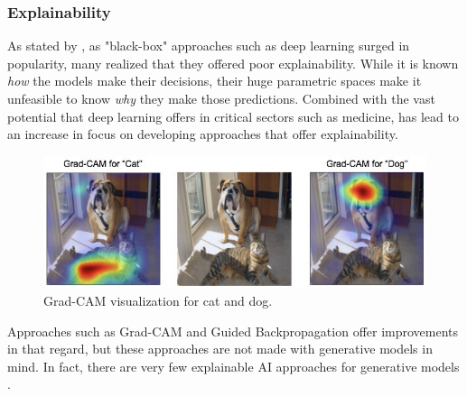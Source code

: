 \subsubsection{Explainability}
As stated by \textcite{XAI}, as "black-box" approaches such as deep learning surged in popularity, many realized that they offered poor explainability. While it is known \textit{how} the models make their decisions, their huge parametric spaces make it unfeasible to know \textit{why} they make those predictions. Combined with the vast potential that deep learning offers in critical sectors such as medicine, has lead to an increase in focus on developing approaches that offer explainability.
\begin{figure}[H]
    \centering
    \includegraphics[width=\linewidth]{resources/related_works/gradcam.jpg}
    \caption{Grad-CAM visualization for cat and dog.}
\end{figure}
Approaches such as Grad-CAM \cite{GradCAM} and Guided Backpropagation \cite{guided_backprop} offer improvements in that regard, but these approaches are not made with generative models in mind. In fact, there are very few explainable AI approaches for generative models \cite{XAI}.
